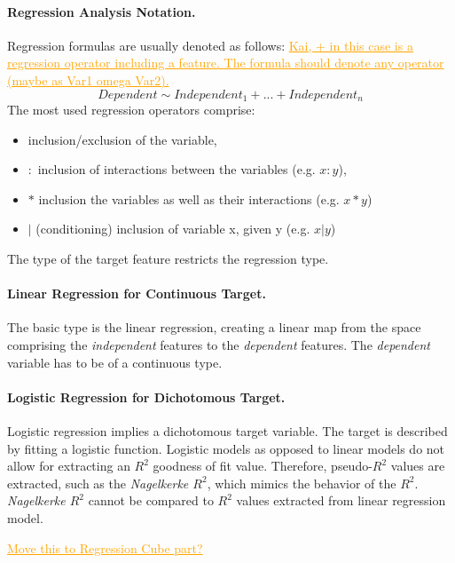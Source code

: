 \documentclass[journal]{style/vgtc} 			          %
\newcommand{\com}[1]{\textcolor{orange}{\uline{#1}}}
\begin{document}
\paragraph{Regression Analysis Notation.} Regression formulas are usually denoted as follows:
\com{Kai, + in this case is a regression operator including a feature. The formula should denote any operator (maybe as Var1 omega Var2).}
\begin{equation}
Dependent \sim Independent_1 + ... + Independent_n
\label{eq:RegressionNotation}
\end{equation}
The most used regression operators comprise:
\begin{itemize}
	\item \fbox{$+,-$} inclusion/exclusion of the variable,
	\item $:$ inclusion of interactions between the variables (e.g. $x:y$),
	\item $*$ inclusion the variables as well as their interactions (e.g. $x*y$)
	\item $|$ (conditioning) inclusion of variable x, given y (e.g. $x|y$)
\end{itemize}
The type of the target feature restricts the regression type.

\paragraph{Linear Regression for Continuous Target.} The basic type is the linear regression, creating a linear map from the space comprising the \emph{independent} features to the \emph{dependent} features.
The \emph{dependent} variable has to be of a continuous type.

\paragraph{Logistic Regression for Dichotomous Target.} Logistic regression implies a dichotomous target variable.
The target is described by fitting a logistic function.
Logistic models as opposed to linear models do not allow for extracting an $R^2$ goodness of fit value.
Therefore, pseudo-$R^2$ values are extracted, such as the \emph{Nagelkerke $R^2$}, which mimics the behavior of the $R^2$.
\emph{Nagelkerke $R^2$} cannot be compared to $R^2$ values extracted from linear regression model.

\com{Move this to Regression Cube part?}
\end{document}
